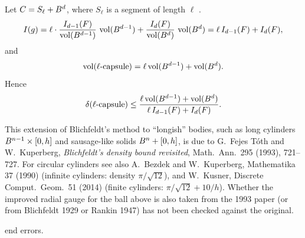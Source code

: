 \begin{example}\label{L3:ex:capsule}
Let $C=S_\ell+B^d$, where $S_\ell$ is a segment of length $\ell$ .
\[
  I(g)=\ell\cdot\frac{I_{d-1}(F)}{\operatorname{vol}(B^{d-1})}\,\operatorname{vol}(B^{d-1})+\frac{I_d(F)}{\operatorname{vol}(B^d)}\,\operatorname{vol}(B^d)
  =\ell\,I_{d-1}(F)+I_d(F),
\]
and
\[
  \operatorname{vol}(\ell\text{-capsule})=\ell\operatorname{vol}(B^{d-1})+\operatorname{vol}(B^d).
\]
Hence
\[
  \delta(\ell\text{-capsule})\le\frac{\ell\operatorname{vol}(B^{d-1})+\operatorname{vol}(B^d)}{\ell\,I_{d-1}(F)+I_d(F)}.
\]
\end{example}

\begin{addedblock}
This extension of Blichfeldt's method to ``longish'' bodies, such as long cylinders
$B^{n-1}\times[0,h]$ and sausage-like solids $B^n+[0,h]$, is due to G.~Fejes T\'oth and
W.~Kuperberg, \emph{Blichfeldt's density bound revisited}, Math.\ Ann.\ 295 (1993), 721--727. For
circular cylinders see also A.~Bezdek and W.~Kuperberg, Mathematika 37 (1990) (infinite cylinders:
density $\pi/\sqrt{12}$), and W.~Kusner, Discrete Comput.\ Geom.\ 51 (2014) (finite cylinders:
$\pi/\sqrt{12}+10/h$). Whether the improved radial gauge for the ball above is also taken from the 1993
paper (or from Blichfeldt 1929 or Rankin 1947) has not been checked against the original.
\end{addedblock}

\begin{remark}
 end errors.
\end{remark}
